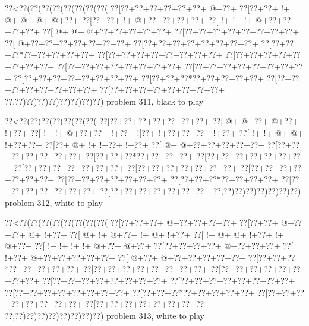 \vbox{\vbox{\goo
\0??<\0??(\0??(\0??(\0??(\0??(\0??(\0??(\0??(
\0??[\0??+\0??+\0??+\0??+\0??+\0??+\- @+\0??+
\0??[\0??+\0??+\- !+\- @+\- @+\- @+\- @+\0??+
\0??[\0??+\0??+\- !+\- @+\0??+\0??+\0??+\0??+
\0??[\- !+\- !+\- !+\- @+\0??+\0??+\0??+\0??+
\0??[\- @+\- @+\- @+\0??+\0??+\0??+\0??+\0??+
\0??[\0??+\0??+\0??+\0??+\0??+\0??+\0??+\0??+
\0??[\- @+\0??+\0??+\0??+\0??+\0??+\0??+\0??+
\0??[\0??+\0??+\0??+\0??+\0??+\0??+\0??+\0??+
\0??[\0??+\0??+\0??*\0??+\0??+\0??+\0??+\0??+
\0??[\0??+\0??+\0??+\0??+\0??+\0??+\0??+\0??+
\0??[\0??+\0??+\0??+\0??+\0??+\0??+\0??+\0??+
\0??[\0??+\0??+\0??+\0??+\0??+\0??+\0??+\0??+
\0??[\0??+\0??+\0??+\0??+\0??+\0??+\0??+\0??+
\0??[\0??+\0??+\0??+\0??+\0??+\0??+\0??+\0??+
\0??[\0??+\0??+\0??*\0??+\0??+\0??+\0??+\0??+
\0??[\0??+\0??+\0??+\0??+\0??+\0??+\0??+\0??+
\0??[\0??+\0??+\0??+\0??+\0??+\0??+\0??+\0??+
\0??,\0??)\0??)\0??)\0??)\0??)\0??)\0??)\0??)
}
\hfil problem 311, black to play\hfil\break
}

\vbox{\vbox{\goo
\0??<\0??(\0??(\0??(\0??(\0??(\0??(\0??(
\0??[\0??+\0??+\0??+\0??+\0??+\0??+\0??+
\0??[\- @+\- @+\0??+\- @+\0??+\- !+\0??+
\0??[\- !+\- !+\- @+\0??+\0??+\- !+\0??+
\- ![\0??+\- !+\0??+\0??+\0??+\- !+\0??+
\0??[\- !+\- !+\- @+\- @+\- !+\0??+\0??+
\0??[\0??+\- @+\- !+\- !+\0??+\- !+\0??+
\0??[\- @+\- @+\0??+\0??+\0??+\0??+\0??+
\0??[\0??+\0??+\0??+\0??+\0??+\0??+\0??+
\0??[\0??+\0??+\0??*\0??+\0??+\0??+\0??+
\0??[\0??+\0??+\0??+\0??+\0??+\0??+\0??+
\0??[\0??+\0??+\0??+\0??+\0??+\0??+\0??+
\0??[\0??+\0??+\0??+\0??+\0??+\0??+\0??+
\0??[\0??+\0??+\0??+\0??+\0??+\0??+\0??+
\0??[\0??+\0??+\0??+\0??+\0??+\0??+\0??+
\0??[\0??+\0??+\0??*\0??+\0??+\0??+\0??+
\0??[\0??+\0??+\0??+\0??+\0??+\0??+\0??+
\0??[\0??+\0??+\0??+\0??+\0??+\0??+\0??+
\0??,\0??)\0??)\0??)\0??)\0??)\0??)\0??)
}
\hfil problem 312, white to play\hfil\break
}

\vbox{\vbox{\goo
\0??<\0??(\0??(\0??(\0??(\0??(\0??(\0??(\0??(
\0??[\0??+\0??+\0??+\- @+\0??+\0??+\0??+\0??+
\0??[\0??+\0??+\- @+\0??+\0??+\- @+\- !+\0??+
\0??[\- @+\- !+\- @+\0??+\- !+\- @+\- !+\0??+
\0??[\- !+\- @+\- @+\- !+\0??+\- !+\- @+\0??+
\0??[\- !+\- !+\- !+\- !+\- @+\0??+\- @+\0??+
\0??[\0??+\0??+\0??+\0??+\- @+\0??+\0??+\0??+
\0??[\- !+\0??+\- @+\0??+\0??+\0??+\0??+\0??+
\0??[\- @+\0??+\- @+\0??+\0??+\0??+\0??+\0??+
\0??[\0??+\0??+\0??*\0??+\0??+\0??+\0??+\0??+
\0??[\0??+\0??+\0??+\0??+\0??+\0??+\0??+\0??+
\0??[\0??+\0??+\0??+\0??+\0??+\0??+\0??+\0??+
\0??[\0??+\0??+\0??+\0??+\0??+\0??+\0??+\0??+
\0??[\0??+\0??+\0??+\0??+\0??+\0??+\0??+\0??+
\0??[\0??+\0??+\0??+\0??+\0??+\0??+\0??+\0??+
\0??[\0??+\0??+\0??*\0??+\0??+\0??+\0??+\0??+
\0??[\0??+\0??+\0??+\0??+\0??+\0??+\0??+\0??+
\0??[\0??+\0??+\0??+\0??+\0??+\0??+\0??+\0??+
\0??,\0??)\0??)\0??)\0??)\0??)\0??)\0??)\0??)
}
\hfil problem 313, white to play\hfil\break
}

